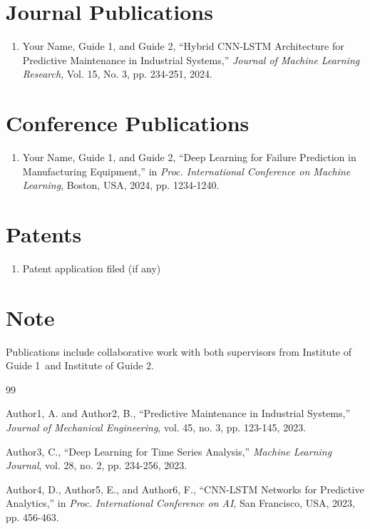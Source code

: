 \documentclass[12pt,a4paper]{report}
\newcommand{\authorname}{Your Name}
\newcommand{\guideIname}{Guide 1}
\newcommand{\guideIinst}{Institute of Guide 1}
\newcommand{\guideIIname}{Guide 2}
\newcommand{\guideIIinst}{Institute of Guide 2}
\begin{document}
\section{Journal Publications}
\begin{enumerate}
\item \authorname, \guideIname, and \guideIIname, ``Hybrid CNN-LSTM Architecture for Predictive Maintenance in Industrial Systems,'' \textit{Journal of Machine Learning Research}, Vol.
15, No. 3, pp. 234-251, 2024.
\end{enumerate}

\section{Conference Publications}
\begin{enumerate}
\item \authorname, \guideIname, and \guideIIname, ``Deep Learning for Failure Prediction in Manufacturing Equipment,'' in \textit{Proc.
International Conference on Machine Learning}, Boston, USA, 2024, pp. 1234-1240.
\end{enumerate}

\section{Patents}
\begin{enumerate}
\item Patent application filed (if any)
\end{enumerate}

\section*{Note}
Publications include collaborative work with both supervisors from \guideIinst\ and \guideIIinst.

\cleardoublepage
\begin{thebibliography}{99}

Author1, A. and Author2, B., ``Predictive Maintenance in Industrial Systems,'' \textit{Journal of Mechanical Engineering}, vol. 45, no.
3, pp. 123-145, 2023.

Author3, C., ``Deep Learning for Time Series Analysis,'' \textit{Machine Learning Journal}, vol. 28, no.
2, pp. 234-256, 2023.

Author4, D., Author5, E., and Author6, F., ``CNN-LSTM Networks for Predictive Analytics,'' in \textit{Proc.
International Conference on AI}, San Francisco, USA, 2023, pp. 456-463.

\end{thebibliography}
\end{document}
